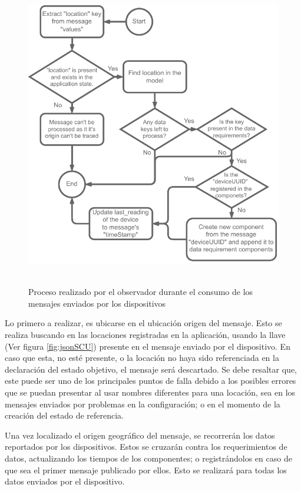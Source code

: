 \begin{figure}[ht]
    \centering
    \caption{\\Proceso realizado por el observador durante el consumo de los mensajes enviados por los dispositivos} 
    \includegraphics[width=0.70\linewidth]{images/LookerProcessUpdateState.pdf}
    \label{fig:LookerProcessUpdateState}
\end{figure} 

Lo primero a realizar, es ubicarse en el ubicación origen del mensaje. Esto se realiza buscando en las locaciones registradas en la aplicación, usando la llave (Ver figura \ref{fig:jsonSCU}) presente en el mensaje enviado por el dispositivo. En caso que esta, no esté presente, o la locación no haya sido referenciada en la declaración del estado objetivo, el mensaje será descartado. Se debe resaltar que, este puede ser uno de los principales puntos de falla debido a los posibles errores que se puedan presentar al usar nombres diferentes para una locación, sea en los mensajes enviados por problemas en la configuración; o en el momento de la creación del estado de referencia. 

Una vez localizado el origen geográfico del mensaje, se recorrerán los datos reportados por los dispositivos. Estos se cruzarán contra los requerimientos de datos, actualizando los tiempos de los componentes; o registrándolos en caso de que sea el primer mensaje publicado por ellos. Esto se realizará para todas los datos enviados por el dispositivo.
 
